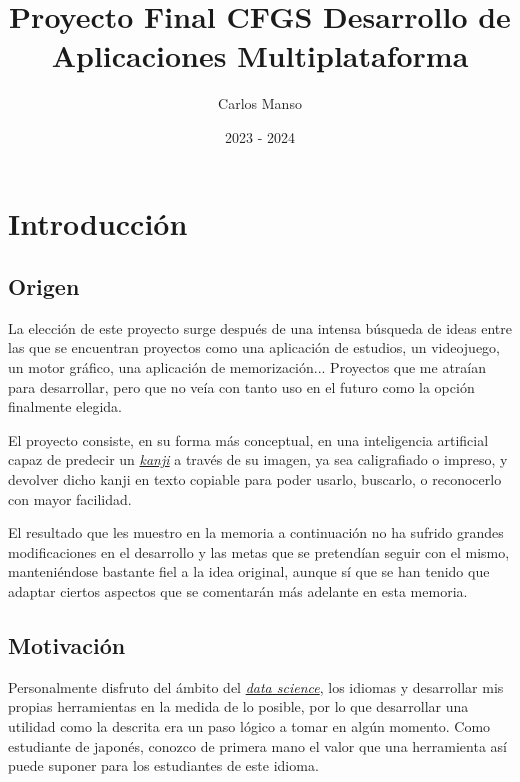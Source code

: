 \documentclass{article}
\title{Proyecto Final CFGS Desarrollo de Aplicaciones Multiplataforma}
\author{Carlos Manso}
\date{2023 - 2024}
\begin{document}
\clearpage\maketitle
\thispagestyle{empty}

\setcounter{tocdepth}{2}
\clearpage\tableofcontents
\thispagestyle{empty}
\newpage


\section{Introducción}
\label{sec:Intro}



\subsection{Origen}
La elección de este proyecto surge después de una intensa búsqueda de ideas entre las que se encuentran proyectos como una aplicación de estudios, un videojuego, un motor gráfico, una aplicación de memorización... Proyectos que me atraían para desarrollar, pero que no veía con tanto uso en el futuro como la opción finalmente elegida.

El proyecto consiste, en su forma más conceptual, en una inteligencia artificial capaz de predecir un \hyperref[sec:terms]{\textit{kanji}\tec} a través de su imagen, ya sea caligrafiado o impreso, y devolver dicho kanji en texto copiable para poder usarlo, buscarlo, o reconocerlo con mayor facilidad.

El resultado que les muestro en la memoria a continuación no ha sufrido grandes modificaciones en el desarrollo y las metas que se pretendían seguir con el mismo, manteniéndose bastante fiel a la idea original, aunque sí que se han tenido que adaptar ciertos aspectos que se comentarán más adelante en esta memoria.

\subsection{Motivación}
Personalmente disfruto del ámbito del \hyperref[sec:terms]{\textit{data science}\tec}, los idiomas y desarrollar mis propias herramientas en la medida de lo posible, por lo que desarrollar una utilidad como la descrita era un paso lógico a tomar en algún momento. Como estudiante de japonés, conozco de primera mano el valor que una herramienta así puede suponer para los estudiantes de este idioma.
\end{document}
